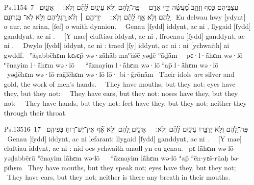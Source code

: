 \begin{example}{Ps.}{115}{4–7}{}{}
	\quoling
	{%
		~עֲצַבֵּיהֶם כֶּ֣סֶף וְזָהָ֑ב מַ֝עֲשֵׂ֗ה יְדֵ֣י אָדָֽם׃\ %
		~פֶּֽה־לָ֭הֶם וְלֹ֣א  עֵינַ֥יִם לָ֝הֶ֗ם וְלֹ֣א ׃\ %
		~אָזְנַ֣יִם לָ֭הֶם וְלֹ֣א  אַ֥ף לָ֝הֶ֗ם וְלֹ֣א ׃\ %
		~יְדֵיהֶ֤ם ׀ וְלֹ֬א  רַ֭גְלֵיהֶם וְלֹ֣א  לֹֽא־ בִּגְרוֹנָֽם׃
	}
	{%
		~Eu delwau hwy [ydynt] o aur, ac arian, [ſef] o waith dynnion.\ %
		~Genau [ſydd] iddynt, ac ni , llygaid [ſydd] ganddynt, ac ni .\ %
		~[Y mae] cluſtiau iddynt, ac ni , ffroenau [ſydd] ganddynt, ac ni .\ %
		~Dwylo [ſydd] iddynt, ac ni : traed [ſy] iddynt, ac ni : ni  [ychwaith] ai gwddf.
	}
	{%
		~ʿăṣabbēhɛm kɛsɛp̄ wə·zå̄hå̄ḇ maʿăśē yəḏē ʾå̄ḏå̄m\ %
		~pɛ·l·å̄hɛm wə·lō  ʿēnayim l·å̄hɛm wə·lō \ %
		~ʾå̄znayim l·å̄hɛm wə·lō  ʾap̄ l·å̄hɛm wə·lō \ %
		~yəḏēhɛm wə·lō  raḡlēhɛm wə·lō  lō· bi·ḡrōnå̄m
	}
	{%
		~Their idols \textit{are} silver and gold, the work of men’s hands.\ %
		~They have mouths, but they  not: eyes have they, but they  not:\ %
		~They have ears, but they  not: noses have they, but they  not:\ %
		~They have hands, but they  not: feet have they, but they  not: neither  they through their throat.
	}
\end{example}

\begin{example}{Ps.}{135}{16–17}{}{}
	\quoling
	{%
		~פֶּֽה־לָ֭הֶם וְלֹ֣א יְדַבֵּ֑רוּ עֵינַ֥יִם לָ֝הֶ֗ם וְלֹ֣א ׃\ %
		~אָזְנַ֣יִם לָ֭הֶם וְלֹ֣א  אַ֝֗ף אֵין־יֶשׁ־ר֥וּחַ בְּפִיהֶֽם׃
	}
	{%
		~Genau [ſydd] iddynt, ac ni lefarant: llygaid [ſydd] ganddynt, ac ni .\ %
		~[Y mae] cluſtiau iddynt, ac ni : nid oes ychwaith anadl yn eu genau.
	}
	{%
		~pɛ-lå̄hɛm wə-lō yəḏabbērū ʿēnayim lå̄hɛm wə-lō \ %
		~ʾå̄znayim lå̄hɛm wə-lō  ʾap̄ ʾēn-yɛš-rūaḥ bə-p̄īhɛm
	}
	{%
		~They have mouths, but they speak not; eyes have they, but they  not;\ %
		~They have ears, but they  not; neither is there any breath in their mouths.
	}
\end{example}

